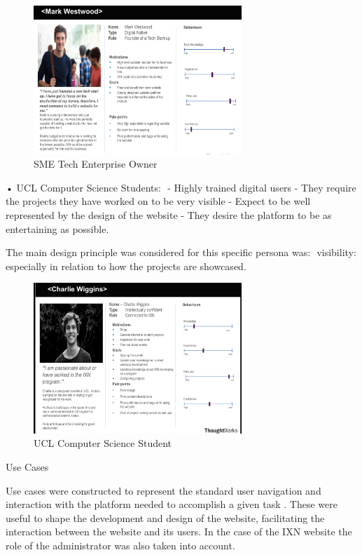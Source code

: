 \documentclass[fontsize=10pt]{extarticle}
\numberwithin{figure}{section} %
\begin{document}
\begin{figure}[H]
      \centering
      \includegraphics[trim = 0 0 0 0, clip, width=0.7\textwidth]{ph1.png}
      \caption{SME Tech Enterprise Owner}
\end{figure}

• UCL Computer Science Students: ​ - Highly trained digital users​ -
They require the projects they have worked on to be very visible​ -
Expect to be well represented by the design of the website​ - They
desire the platform to be as entertaining as possible. ​

The main design principle was considered for this specific persona was:
​ visibility: especially in relation to how the projects are showcased.
​

\begin{figure}[H]
      \centering
      \includegraphics[trim = 0 0 0 0, clip, width=0.7\textwidth]{persona1.png}
      \caption{UCL Computer Science Student}
\end{figure}

Use Cases

Use cases were constructed to represent the standard user navigation and
interaction with the platform needed to accomplish a given task
\cite{g3}. These were useful to shape the development and design of the
website, facilitating the interaction between the website and its users.
In the case of the IXN website the role of the administrator was also
taken into account.
\end{document}

